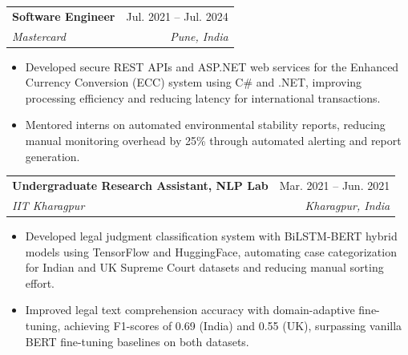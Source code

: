 \documentclass[letterpaper,11pt]{article}
\makeatletter
\newcommand{\resumeItem}[1]{
  \item\small{
    {#1 \vspace{-2pt}}
  }
}
\newcommand{\resumeSubheading}[4]{
  \vspace{-2pt}\item
    \begin{tabular*}{0.97\textwidth}[t]{l@{\extracolsep{\fill}}r}
      \textbf{#1} & #2 \\
      \textit{\small#3} & \textit{\small #4} \\
    \end{tabular*}\vspace{-7pt}
}
\newcommand{\resumeItemListStart}{\begin{itemize}[noitemsep, topsep=0pt, parsep=0pt]}
\newcommand{\resumeItemListEnd}{\end{itemize}\vspace{-5pt}}
\makeatother
\begin{document}

  \resumeSubheading
    {Software Engineer}{Jul. 2021 -- Jul. 2024}
    {Mastercard}{Pune, India}
    \resumeItemListStart
      \resumeItem{Developed secure REST APIs and ASP.NET web services for the Enhanced Currency Conversion (ECC) system using C\# and .NET, improving processing efficiency and reducing latency for international transactions.}
      \resumeItem{Mentored interns on automated environmental stability reports, reducing manual monitoring overhead by 25\% through automated alerting and report generation.}
    \resumeItemListEnd

  \resumeSubheading
    {Undergraduate Research Assistant, NLP Lab}{Mar. 2021 -- Jun. 2021}
    {IIT Kharagpur}{Kharagpur, India}
    \resumeItemListStart
      \resumeItem{Developed legal judgment classification system with BiLSTM-BERT hybrid models using TensorFlow and HuggingFace, automating case categorization for Indian and UK Supreme Court datasets and reducing manual sorting effort.}
      \resumeItem{Improved legal text comprehension accuracy with domain-adaptive fine-tuning, achieving F1-scores of 0.69 (India) and 0.55 (UK), surpassing vanilla BERT fine-tuning baselines on both datasets.}
    \resumeItemListEnd
\end{document}
